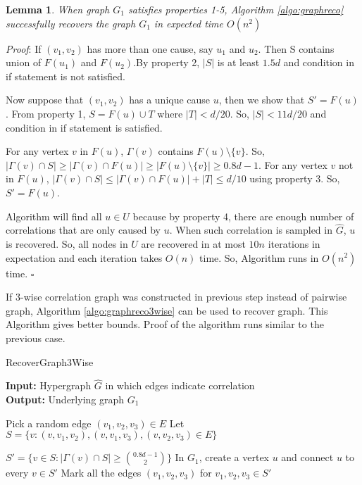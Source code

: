 \documentclass[11pt]{article}
\newtheorem{lemma}{Lemma}
\begin{document}
	\begin{lemma}
		When graph $G_1$ satisfies properties 1-5, Algorithm \ref{algo:graphreco} successfully recovers the graph $G_1$ in expected time $O(n^2)$
	\end{lemma}
	\emph{Proof}: If $(v_1,v_2)$ has more than one cause, say $u_1$ and $u_2$. Then S contains union of $F(u_1)$ and $F(u_2)$.By property 2, $|S|$ is at least $1.5d$ and condition in if statement is not satisfied.

	Now suppose that  $(v_1,v_2)$ has a unique cause $u$, then we show that $S' = F(u)$. From property 1, $S = F(u)\cup T$ where $|T|<d/20$. So, $|S|<11d/20$ and condition in if statement is satisfied. 

	For any vertex $v$ in $F(u)$, $\Gamma(v)$ contains $F(u)\setminus\{v\}$. So, $|\Gamma(v) \cap S| \geq |\Gamma(v) \cap F(u)| \geq |F(u)\setminus\{v\}|\geq 0.8d-1$. For any vertex $v$ not in $F(u)$, $|\Gamma(v) \cap S| \leq |\Gamma(v) \cap F(u)| + |T| \leq d/10$ using property 3. So, $S' = F(u)$. 

	Algorithm will find all $u \in U$ because by property 4, there are enough number of correlations that are only caused by $u$. When such correlation is sampled in $\hat{G}$, $u$ is recovered. So, all nodes in $U$ are recovered in at most $10n$ iterations in expectation and each iteration takes $O(n)$ time. So, Algorithm runs in $O(n^2)$ time. $\square$
	\vspace{10pt}

	If 3-wise correlation graph was constructed in previous step instead of pairwise graph, Algorithm \ref{algo:graphreco3wise} can be used to recover graph. This Algorithm gives better bounds. Proof of the algorithm runs similar to the previous case.

	\begin{algorithm}[H]
		\caption{RecoverGraph3Wise}
		\label{algo:graphreco3wise}
		\textbf{Input:}  Hypergraph $\hat{G}$ in which edges indicate correlation\\
		\textbf{Output:} Underlying graph $G_1$
		\begin{algorithmic}[1]
			\REPEAT
			\STATE Pick a random edge $(v_1,v_2,v_3) \in E$
			\STATE Let $S = \{v: (v,v_1,v_2),(v,v_1,v_3), (v,v_2,v_3) \in E \}$

			\STATE $S' = \{ v \in S: |\Gamma(v)\cap S|\geq {0.8d-1\choose 2}\}$
			\STATE In $G_1$, create a vertex $u$ and connect $u$ to every $v \in S'$
			\STATE Mark all the edges $(v_1,v_2,v_3)$ for $v_1,v_2,v_3\in S'$
			\ENDIF
		\end{algorithmic}
	\end{algorithm}
\end{document}
